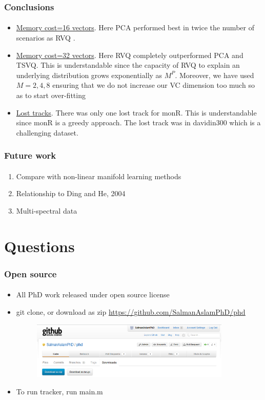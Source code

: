 \begin{frame}
\frametitle{Conclusions}
\framesubtitle{}
\logoCSIPCPL\mypagenum
\begin{itemize}
\item \underline{Memory cost=16 vectors}.  Here PCA performed best in twice the number of scenarios as RVQ .
\item \underline{Memory cost=32 vectors}.  Here RVQ completely outperformed PCA and TSVQ.  This is understandable since the capacity of RVQ to explain an underlying distribution grows exponentially as $M^P$.  Moreover, we have used $M=2, 4, 8$ ensuring that we do not increase our VC dimension too much so as to start over-fitting
\item \underline{Lost tracks}.  There was only one lost track for monR.  This is understandable since monR is a greedy approach.  The lost track was in davidin300 which is a challenging dataset.
\end{itemize}
\end{frame}


\begin{frame}
\frametitle{Future work}
\framesubtitle{}
\logoCSIPCPL\mypagenum
\setcounter{subfigure}{0}
\begin{enumerate}
\item Compare with non-linear manifold learning methods
\item Relationship to Ding and He, 2004
\item Multi-spectral data
\end{enumerate}
\end{frame}

\section{Questions}
\begin{frame}
\frametitle{Open source}
\framesubtitle{}
\logoCSIPCPL\mypagenum
\setcounter{subfigure}{0}
\begin{itemize}
\item All PhD work released under open source license
\item git clone, or download as zip
{\color{blue}\underline{\url{https://github.com/SalmanAslamPhD/phd}}}
\begin{figure}
\includegraphics[width=0.9\textwidth]{thesis/github.png}
\end{figure}
\item To run tracker, run main.m
\end{itemize}
\end{frame}


